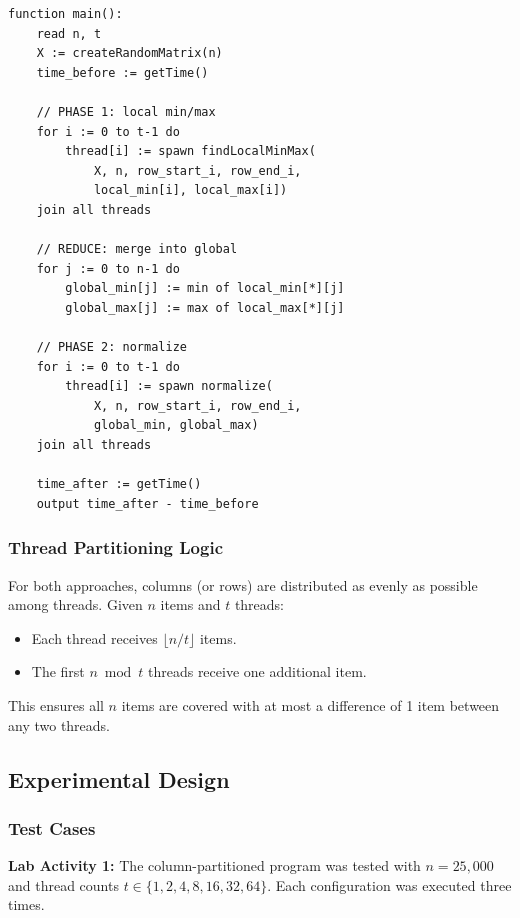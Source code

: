 \documentclass[journal]{IEEEtran}
\begin{document}
\begin{lstlisting}[style=ccode, caption={Row Partitioning Pseudocode}]
function main():
    read n, t
    X := createRandomMatrix(n)
    time_before := getTime()
    
    // PHASE 1: local min/max
    for i := 0 to t-1 do
        thread[i] := spawn findLocalMinMax(
            X, n, row_start_i, row_end_i,
            local_min[i], local_max[i])
    join all threads
    
    // REDUCE: merge into global
    for j := 0 to n-1 do
        global_min[j] := min of local_min[*][j]
        global_max[j] := max of local_max[*][j]
    
    // PHASE 2: normalize
    for i := 0 to t-1 do
        thread[i] := spawn normalize(
            X, n, row_start_i, row_end_i,
            global_min, global_max)
    join all threads
    
    time_after := getTime()
    output time_after - time_before
\end{lstlisting}

\subsubsection{Thread Partitioning Logic}

For both approaches, columns (or rows) are distributed as evenly as possible among threads. Given $n$ items and $t$ threads:

\begin{itemize}
    \item Each thread receives $\lfloor n/t \rfloor$ items.
    \item The first $n \bmod t$ threads receive one additional item.
\end{itemize}

This ensures all $n$ items are covered with at most a difference of 1 item between any two threads.

\subsection{Experimental Design}

\subsubsection{Test Cases}

\textbf{Lab Activity 1:} The column-partitioned program was tested with $n = 25{,}000$ and thread counts $t \in \{1, 2, 4, 8, 16, 32, 64\}$. Each configuration was executed three times.
\end{document}
